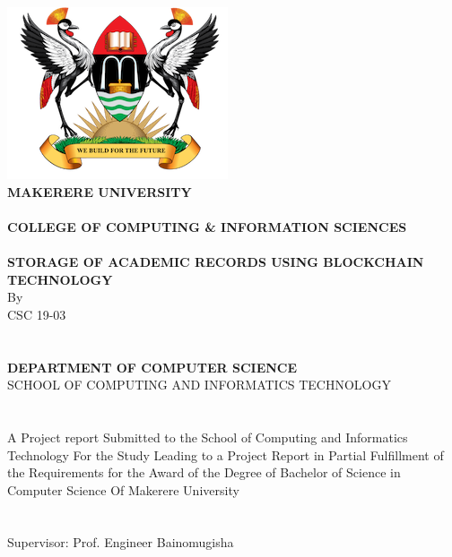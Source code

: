 \begin{titlepage}
\begin{center}

		\includegraphics{images/muklogo2.png} \\
		
\large\textbf{MAKERERE UNIVERSITY}\\~\\

\textbf{COLLEGE OF COMPUTING \& INFORMATION SCIENCES}\\~\\
\textbf{STORAGE OF ACADEMIC RECORDS USING BLOCKCHAIN TECHNOLOGY}\\
By \\ 
CSC 19-03\\~\\~\\
\textbf{DEPARTMENT OF COMPUTER SCIENCE}\\
\normalsize{SCHOOL OF COMPUTING AND INFORMATICS TECHNOLOGY}\\~\\~\\
A Project report Submitted to the School of Computing and Informatics Technology
For the Study Leading to a Project Report in Partial Fulfillment of the
Requirements for the Award of the Degree of Bachelor of Science in Computer Science 
Of Makerere University\\~\\~\\
Supervisor: Prof. Engineer Bainomugisha\\~\\


\end{center}
\end{titlepage}

